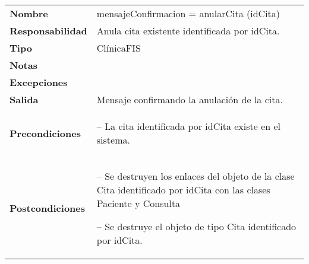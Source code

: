  \begin{table}[H]
  \centering
  \begin{tabularx}{\textwidth}{l|X}
    \textbf{Nombre}        &  mensajeConfirmacion = anularCita (idCita) \\ 
    \textbf{Responsabilidad}  & Anula cita existente identificada por idCita. \\ 
    \textbf{Tipo}        &  ClínicaFIS \\ 
    \textbf{Notas}        &  \\
    \textbf{Excepciones}    & \\
    \textbf{Salida}        &  Mensaje confirmando la anulación de la cita.\\ 
    \textbf{Precondiciones}    &
    \begin{itemizenomargins}
    \item[--] La cita identificada por idCita existe en el sistema.
    \end{itemizenomargins} \\ 
    \textbf{Postcondiciones}  &
    \begin{itemizenomargins}
    \item[--] Se destruyen los enlaces del objeto de la clase Cita identificado
      por idCita con las clases Paciente y Consulta
    \item[--] Se destruye el objeto de tipo Cita identificado por idCita.
    \end{itemizenomargins}

  \end{tabularx}
\end{table}
